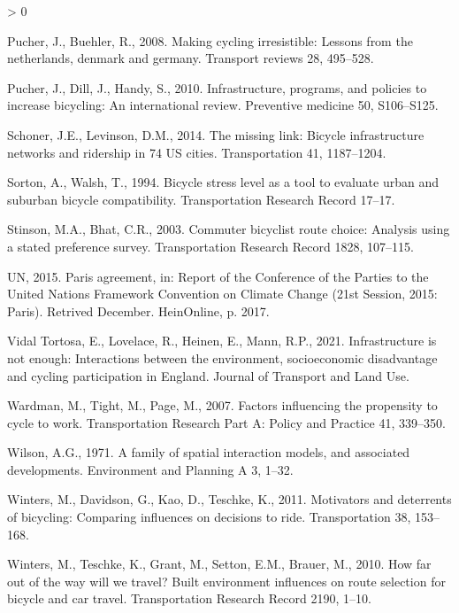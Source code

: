 \documentclass[
]{article}
\newlength{\cslhangindent}
\newenvironment{CSLReferences}[2] %
 {%
  \setlength{\parindent}{0pt}
  \ifodd #1 \everypar{\setlength{\hangindent}{\cslhangindent}}\ignorespaces\fi
  \ifnum #2 > 0
  \setlength{\parskip}{#2\baselineskip}
  \fi
 }%
 {}
\begin{document}
\begin{CSLReferences}{1}{0}
\leavevmode\hypertarget{ref-pucher2008making}{}%
Pucher, J., Buehler, R., 2008. Making cycling irresistible: Lessons from the netherlands, denmark and germany. Transport reviews 28, 495--528.

\leavevmode\hypertarget{ref-pucher2010infrastructure}{}%
Pucher, J., Dill, J., Handy, S., 2010. Infrastructure, programs, and policies to increase bicycling: An international review. Preventive medicine 50, S106--S125.

\leavevmode\hypertarget{ref-schoner2014missing}{}%
Schoner, J.E., Levinson, D.M., 2014. The missing link: Bicycle infrastructure networks and ridership in 74 US cities. Transportation 41, 1187--1204.

\leavevmode\hypertarget{ref-sorton1994bicycle}{}%
Sorton, A., Walsh, T., 1994. Bicycle stress level as a tool to evaluate urban and suburban bicycle compatibility. Transportation Research Record 17--17.

\leavevmode\hypertarget{ref-stinson2003commuter}{}%
Stinson, M.A., Bhat, C.R., 2003. Commuter bicyclist route choice: Analysis using a stated preference survey. Transportation Research Record 1828, 107--115.

\leavevmode\hypertarget{ref-agreement2015paris}{}%
UN, 2015. Paris agreement, in: Report of the Conference of the Parties to the United Nations Framework Convention on Climate Change (21st Session, 2015: Paris). Retrived December. HeinOnline, p. 2017.

\leavevmode\hypertarget{ref-vidaltortosa_infrastructure_2020}{}%
Vidal Tortosa, E., Lovelace, R., Heinen, E., Mann, R.P., 2021. Infrastructure is not enough: Interactions between the environment, socioeconomic disadvantage and cycling participation in {England}. Journal of Transport and Land Use.

\leavevmode\hypertarget{ref-wardman2007factors}{}%
Wardman, M., Tight, M., Page, M., 2007. Factors influencing the propensity to cycle to work. Transportation Research Part A: Policy and Practice 41, 339--350.

\leavevmode\hypertarget{ref-wilson1971family}{}%
Wilson, A.G., 1971. A family of spatial interaction models, and associated developments. Environment and Planning A 3, 1--32.

\leavevmode\hypertarget{ref-winters2011motivators}{}%
Winters, M., Davidson, G., Kao, D., Teschke, K., 2011. Motivators and deterrents of bicycling: Comparing influences on decisions to ride. Transportation 38, 153--168.

\leavevmode\hypertarget{ref-winters2010far}{}%
Winters, M., Teschke, K., Grant, M., Setton, E.M., Brauer, M., 2010. How far out of the way will we travel? Built environment influences on route selection for bicycle and car travel. Transportation Research Record 2190, 1--10.

\end{CSLReferences}
\end{document}
